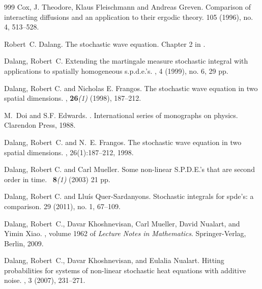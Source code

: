\documentclass[a4paper,12pt]{article}
\theoremstyle{plain}
\theoremstyle{definition}
\begin{document}
\begin{thebibliography}{999}
Cox, J. Theodore, Klaus Fleischmann and Andreas Greven.
\newblock Comparison of interacting diffusions and an application to their ergodic theory. 
 105 (1996), no. 4, 513--528. 

Robert~C. Dalang.
\newblock The stochastic wave equation.
\newblock Chapter 2 in \cite{DalangEtc08Minicourse}.

Dalang, Robert~C.
\newblock Extending the martingale measure stochastic integral with applications to spatially homogeneous s.p.d.e.'s.
, 4 (1999), no. 6, 29 pp.

Dalang, Robert C. and Nicholas E. Frangos.
\newblock The stochastic wave equation in two spatial dimensions.
, {\bf 26}{\it (1)} (1998), 187--212.

M.~Doi and S.F. Edwards.
.
\newblock International series of monographs on physics. Clarendon Press,
1988.

Dalang, Robert~C. and N.~E. Frangos.
\newblock The stochastic wave equation in two spatial dimensions.
, 26(1):187--212, 1998.

 Dalang, Robert C. and Carl Mueller.
\newblock Some non-linear S.P.D.E.'s that are second order in time.
\ {\bf 8}{\it (1)} (2003) 21 pp.


Dalang, Robert C. and Llu\'is Quer-Sardanyons.
\newblock Stochastic integrals for spde's: a comparison.
 29 (2011), no. 1, 67--109. 


Dalang, Robert~C., Davar Khoshnevisan, Carl Mueller, David Nualart, and Yimin Xiao.
,
\newblock volume 1962 of {\em Lecture Notes in Mathematics}.  Springer-Verlag, Berlin, 2009.

Dalang, Robert~C., Davar Khoshnevisan, and Eulalia Nualart.
\newblock Hitting probabilities for systems of non-linear stochastic heat equations with additive noise.
, 3 (2007), 231--271. 


\end{thebibliography}
\end{document}
